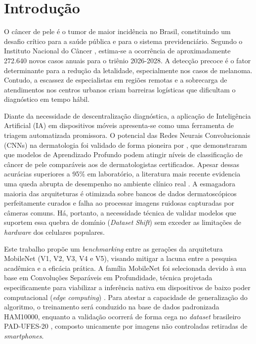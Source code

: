 \documentclass[oneside,english,brazilian]{UNISINOSmonografia}
\begin{document}
\tableofcontents

\chapter{Introdução}

O câncer de pele é o tumor de maior incidência no Brasil, constituindo um desafio crítico para a saúde pública e para o sistema previdenciário. Segundo o Instituto Nacional do Câncer \cite{inca2026estimativa}, estima-se a ocorrência de aproximadamente 272.640 novos casos anuais para o triênio 2026-2028. A detecção precoce é o fator determinante para a redução da letalidade, especialmente nos casos de melanoma. Contudo, a escassez de especialistas em regiões remotas e a sobrecarga de atendimentos nos centros urbanos criam barreiras logísticas que dificultam o diagnóstico em tempo hábil.

Diante da necessidade de descentralização diagnóstica, a aplicação de Inteligência Artificial (IA) em dispositivos móveis apresenta-se como uma ferramenta de triagem automatizada promissora. O potencial das Redes Neurais Convolucionais (CNNs) na dermatologia foi validado de forma pioneira por , que demonstraram que modelos de Aprendizado Profundo podem atingir níveis de classificação de câncer de pele comparáveis aos de dermatologistas certificados. Apesar dessas acurácias superiores a 95\% em laboratório, a literatura mais recente evidencia uma queda abrupta de desempenho no ambiente clínico real \cite{wolf2025deep}. A esmagadora maioria das arquiteturas é otimizada sobre bancos de dados dermatoscópicos perfeitamente curados e falha ao processar imagens ruidosas capturadas por câmeras comuns. Há, portanto, a necessidade técnica de validar modelos que suportem essa quebra de domínio (\textit{Dataset Shift}) sem exceder as limitações de \textit{hardware} dos celulares populares.

Este trabalho propõe um \textit{benchmarking} entre as gerações da arquitetura MobileNet (V1, V2, V3, V4 e V5), visando mitigar a lacuna entre a pesquisa acadêmica e a eficácia prática. A família MobileNet foi selecionada devido à sua base em Convoluções Separáveis em Profundidade, técnica projetada especificamente para viabilizar a inferência nativa em dispositivos de baixo poder computacional (\textit{edge computing}) \cite{howard2017mobilenets_google}. Para atestar a capacidade de generalização do algoritmo, o treinamento será conduzido na base de dados padronizada HAM10000, enquanto a validação ocorrerá de forma cega no \textit{dataset} brasileiro PAD-UFES-20 \cite{pacheco2020pad}, composto unicamente por imagens não controladas retiradas de \textit{smartphones}.
\end{document}
